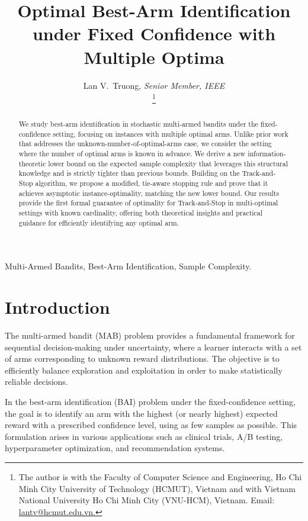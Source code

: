 \documentclass[final]{IEEEtran}
\begin{document}
\title{Optimal Best-Arm Identification under Fixed Confidence with Multiple Optima}
\author{Lan V.\ Truong,  {\em Senior Member, IEEE}
         
\thanks{The author is with the Faculty of Computer Science and Engineering, Ho Chi Minh City University of Technology (HCMUT), Vietnam and with Vietnam National University Ho Chi Minh City (VNU-HCM), Vietnam. Email: \url{lantv@hcmut.edu.vn.}
}}

\maketitle

\begin{abstract}
We study best-arm identification in stochastic multi-armed bandits under the fixed-confidence setting, focusing on instances with multiple optimal arms. Unlike prior work that addresses the unknown-number-of-optimal-arms case, we consider the setting where the number of optimal arms is known in advance. We derive a new information-theoretic lower bound on the expected sample complexity that leverages this structural knowledge and is strictly tighter than previous bounds. Building on the Track-and-Stop algorithm, we propose a modified, tie-aware stopping rule and prove that it achieves asymptotic instance-optimality, matching the new lower bound. Our results provide the first formal guarantee of optimality for Track-and-Stop in multi-optimal settings with known cardinality, offering both theoretical insights and practical guidance for efficiently identifying any optimal arm.
\end{abstract}
\begin{IEEEkeywords}
Multi-Armed Bandits, Best-Arm Identification, Sample Complexity.
\end{IEEEkeywords}
\section{Introduction}

The multi-armed bandit (MAB) problem provides a fundamental framework for sequential decision-making under uncertainty, where a learner interacts with a set of arms corresponding to unknown reward distributions. The objective is to efficiently balance exploration and exploitation in order to make statistically reliable decisions.

In the best-arm identification (BAI) problem under the fixed-confidence setting, the goal is to identify an arm with the highest (or nearly highest) expected reward with a prescribed confidence level, using as few samples as possible. This formulation arises in various applications such as clinical trials, A/B testing, hyperparameter optimization, and recommendation systems.
\end{document}
